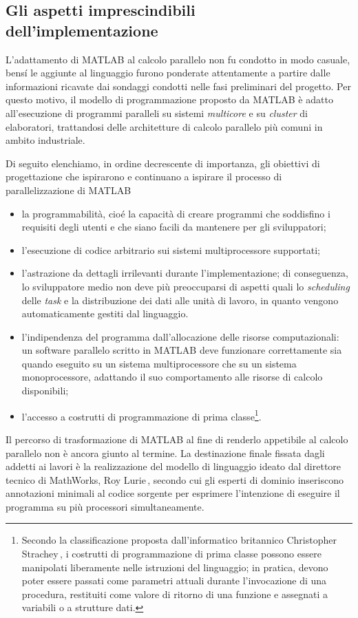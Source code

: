 \subsection{Gli aspetti imprescindibili dell'implementazione}
\label{sec:aspettiImplementazioneMATLABParallelo}
L'adattamento di MATLAB al calcolo parallelo non fu condotto in modo casuale, bens\'i le aggiunte al linguaggio furono ponderate attentamente a partire dalle informazioni ricavate dai sondaggi condotti nelle fasi preliminari del progetto.\newline
Per questo motivo, il modello di programmazione proposto da MATLAB \`e adatto all'esecuzione di programmi paralleli su sistemi \textit{multicore} e su \textit{cluster} di elaboratori, trattandosi delle architetture di calcolo parallelo pi\`u comuni in ambito industriale.

Di seguito elenchiamo, in ordine decrescente di importanza, gli obiettivi di progettazione che ispirarono e continuano a ispirare il processo di parallelizzazione di MATLAB
\begin{itemize}
    \item la programmabilit\`a, cio\'e la capacit\`a di creare programmi che soddisfino i requisiti degli utenti e che siano facili da mantenere per gli sviluppatori;
    \item l'esecuzione di codice arbitrario sui sistemi multiprocessore supportati;
    \item l'astrazione da dettagli irrilevanti durante l'implementazione; di conseguenza, lo sviluppatore medio non deve pi\`u preoccuparsi di aspetti quali lo \textit{scheduling} delle \textit{task} e la distribuzione dei dati alle unit\`a di lavoro, in quanto vengono automaticamente gestiti dal linguaggio.
    \item l'indipendenza del programma dall'allocazione delle risorse computazionali: un software parallelo scritto in MATLAB deve funzionare correttamente sia quando eseguito su un sistema multiprocessore che su un sistema monoprocessore, adattando il suo comportamento alle risorse di calcolo disponibili;
    \item l'accesso a costrutti di programmazione di prima classe\footnote{Secondo la classificazione proposta dall'informatico britannico Christopher Strachey\,\cite{Abelson2002}, i costrutti di programmazione di prima classe possono essere manipolati liberamente nelle istruzioni del linguaggio; in pratica, devono poter essere passati come parametri attuali durante l'invocazione di una procedura, restituiti come valore di ritorno di una funzione e assegnati a variabili o a strutture dati.}.
\end{itemize}
Il percorso di trasformazione di MATLAB al fine di renderlo appetibile al calcolo parallelo non \`e ancora giunto al termine. \newline La destinazione finale fissata
dagli addetti ai lavori \`e la realizzazione del modello di linguaggio ideato dal direttore tecnico di MathWorks, Roy Lurie\,\cite{Hemsoth2008},
secondo cui gli esperti di dominio inseriscono annotazioni minimali al codice sorgente per esprimere l'intenzione di eseguire il programma
su pi\`u processori simultaneamente.
